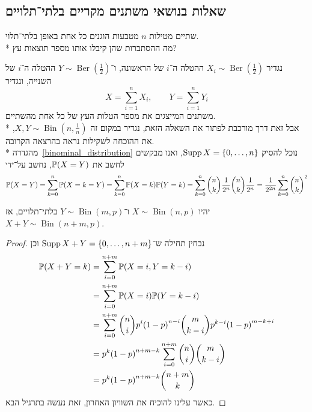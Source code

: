 \subsection{שאלות בנושאי משתנים מקריים בלתי־תלויים}
\begin{exercise}
	שתיים מטילות $n$ מטבעות הוגנים כל אחת באופן בלתי־תלוי. \\*
	מה ההסתברות שהן קיבלו אותו מספר תוצאות עץ?
\end{exercise}
\begin{solution}
	נגדיר $X_i \sim \operatorname{Ber}(\frac{1}{2})$ ההטלה ה־$i$ של הראשונה, ו־$Y \sim \operatorname{Ber}(\frac{1}{2})$ ההטלה ה־$i$ של השנייה, ונגדיר
	\[
		X = \sum_{i = 1}^{n} X_i,
		\qquad
		Y = \sum_{i = 1}^{n} Y_i
	\]
	משתנים המייצגים את מספר הטלות העץ של כל אחת מהשתיים. \\*
	אבל זאת דרך מורכבת לפתור את השאלה הזאת, נגדיר במקום זה $X, Y \sim \operatorname{Bin}(n, \frac{1}{n})$, את ההוכחה לשקילות נראה בהרצאה הקרובה. \\*
	מהגדרה\ \ref{binominal_distribution} נוכל להסיק $\operatorname{Supp} X = \{0, \dots, n\}$, ואנו מבקשים לחשב את $\mathbb{P}(X = Y)$, נחשב על־ידי
	\[
		\mathbb{P}(X = Y)
		= \sum_{k = 0}^{n} \mathbb{P}(X = k = Y)
		= \sum_{k = 0}^{n} \mathbb{P}(X = k) \mathbb{P}(Y = k)
		= \sum_{k = 0}^{n} \binom{n}{k} \frac{1}{2^n} \binom{n}{k} \frac{1}{2^n}
		= \frac{1}{2^{2n}} \sum_{k = 0}^{n} {\binom{n}{k}}^2
	\]
\end{solution}
\begin{proposition}\label{binominal_distributions_summation_proposition}
	יהיו $X \sim \operatorname{Bin}(n, p)$ ו־$Y \sim \operatorname{Bin}(m, p)$ בלתי־תלויים, אז $X + Y \sim \operatorname{Bin}(n + m, p)$.
\end{proposition}
\begin{proof}
	נבחין תחילה ש־$\operatorname{Supp} X + Y = \{0, \dots, n + m\}$ וכן
	\begin{align*}
		\mathbb{P}(X + Y = k)
		& = \sum_{i = 0}^{n + m} \mathbb{P}(X = i, Y = k - i) \\
		& = \sum_{i = 0}^{n + m} \mathbb{P}(X = i) \mathbb{P}(Y = k - i) \\
		& = \sum_{i = 0}^{n + m} \binom{n}{i} p^i {(1 - p)}^{n - i} \binom{m}{k - i} p^{k - i} {(1 - p)}^{m - k + i} \\
		& = p^k {(1 - p)}^{n + m - k} \sum_{i = 0}^{n + m} \binom{n}{i} \binom{m}{k - i} \\
		& = p^k {(1 - p)}^{n + m - k} \binom{n + m}{k}
	\end{align*}
	כאשר עלינו להוכיח את השוויון האחרון, זאת נעשה בתרגיל הבא.
\end{proof}
